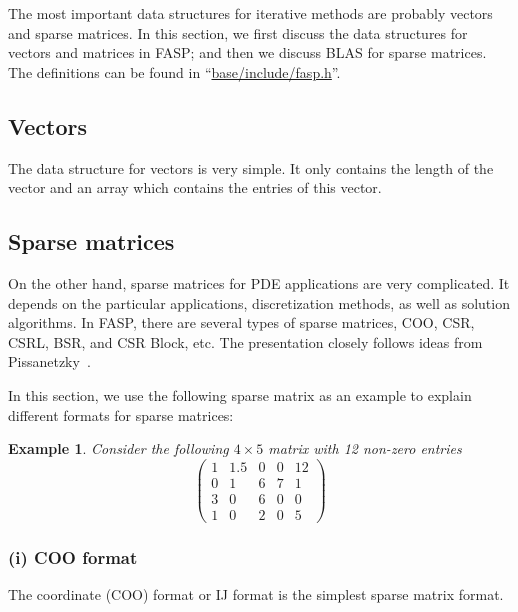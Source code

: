 \documentclass[11pt]{memoir}
\newtheorem{example}[theorem]{Example}
\begin{document}
The most important data structures for iterative methods are probably vectors and sparse matrices. In this section, we first discuss the data structures for vectors and matrices in FASP; and then we discuss BLAS for sparse matrices. The definitions can be found in ``\url{base/include/fasp.h}''. 

\subsection{Vectors}

The data structure for vectors is very simple. It only contains the length of the vector and an array which contains the entries of this vector.
%

%

\subsection{Sparse matrices}

On the other hand, sparse matrices for PDE applications are very complicated. It depends on the particular applications, discretization methods, as well as solution algorithms. In FASP, there are several types of sparse matrices, COO, CSR, CSRL, BSR, and CSR Block, etc. The presentation closely follows ideas from Pissanetzky~\cite{Pissanetzky.Pissanetzky.1984hc}.

In this section, we use the following sparse matrix as an example to explain different formats for sparse matrices:
%
\begin{example}\label{ex:sparse}
Consider the following $4\times 5$ matrix with 12 non-zero entries
$$
\left(\begin{array}{ccccc}
1 & 1.5 & 0 & 0 & 12\\
0 & 1    & 6 & 7 & 1\\
3 & 0    & 6 & 0 & 0\\
1 & 0    & 2 & 0 & 5
\end{array}
\right)
$$
\end{example}

\subsubsection*{(i) COO format}

The coordinate (COO) format or IJ format is the simplest sparse matrix format.
%

%
\end{document}
